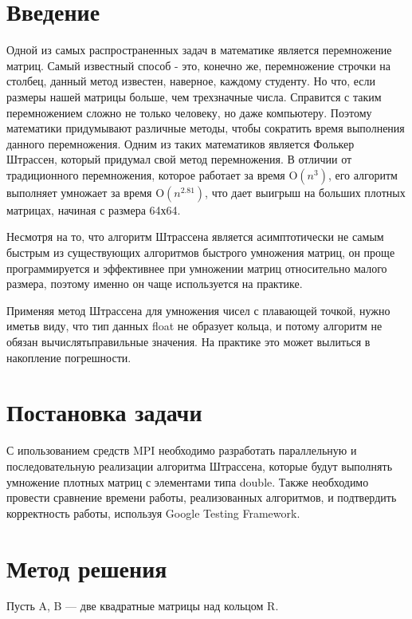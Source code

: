 \documentclass{report}
\begin{document}
\setcounter{page}{2}

\tableofcontents
\newpage

\section*{Введение}
Одной из самых распространенных задач в математике является перемножение матриц. Самый известный способ - это, конечно же, перемножение строчки на столбец, данный метод известен, наверное, каждому студенту. Но что, если размеры нашей матрицы больше, чем трехзначные числа. Справится с таким перемножением сложно не только человеку, но даже компьютеру. Поэтому математики придумывают различные методы, чтобы сократить время выполнения данного перемножения. Одним из таких математиков является Фолькер Штрассен, который придумал свой метод перемножения. В отличии от традиционного перемножения, которое работает за время O$(n^3)$, его алгоритм выполняет умножает за время O$(n^{2.81})$, что дает выигрыш на больших плотных матрицах, начиная с размера 64х64.

Несмотря на то, что алгоритм Штрассена является асимптотически не самым быстрым из существующих алгоритмов быстрого умножения матриц, он проще программируется и эффективнее при умножении матриц относительно малого размера, поэтому именно он чаще используется на практике. 

Применяя метод Штрассена для умножения чисел с плавающей точкой, нужно иметьв виду, что тип данных float не образует кольца, и потому алгоритм не обязан вычислятьправильные значения. На практике это может вылиться в накопление погрешности.
\newpage

\section*{Постановка задачи}
С ипользованием средств MPI необходимо разработать параллельную и последовательную реализации алгоритма Штрассена, которые будут выполнять умножение плотных матриц с элементами типа double. Также необходимо провести сравнение времени работы, реализованных алгоритмов, и подтвердить корректность работы, используя Google Testing Framework.
\newpage

\section*{Метод решения}
Пусть A, B — две квадратные матрицы над кольцом R.
\end{document}
